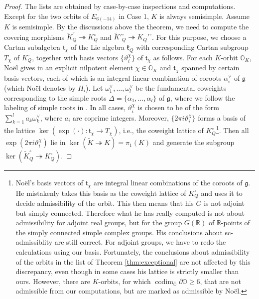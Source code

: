 \documentclass[12pt]{amsart}
\newcommand{\C}{\mathbb{C}}
\newcommand{\g}{\mathfrak{g}}
\newcommand{\Orb}{\mathbb{O}}
\newcommand{\Z}{\mathbb{Z}}
\newcommand{\kf}{\mathfrak{k}}
\newcommand{\tf}{\mathfrak{t}}
\newcommand{\R}{\mathbb{R}}
\theoremstyle{definition}
\numberwithin{equation}{section}
\begin{document}
\begin{proof}
	The lists are obtained by case-by-case inspections and computations. 
	Except for the two orbits of $E_{6(-14)}$ in Case 1, $K$ is always semisimple. Assume $K$ is semisimple. By the discussions above the theorem, we need to compute the covering morphisms $\tilde{K}_Q^\circ \twoheadrightarrow K_Q^\circ$ and $\tilde{K}'^\circ_Q \twoheadrightarrow K_Q'^\circ$. 
	For this purpose, we choose a Cartan subalgebra $\tf_\chi$ of the Lie algebra $\kf_Q$ with corresponding Cartan subgroup $T_\chi$ of $K_Q^\circ$, together with basis vectors $\{\vartheta^{\chi}_i \}$ of $\tf_\chi$ as follows. For each $K$-orbit $\Orb_K$, No{\"e}l gives in \cite{Noel1, Noel2} an explicit nilpotent element $\chi \in \Orb_K$ and $\tf_\chi$ spanned by certain basis vectors, each of which is an integral linear combination of coroots $\alpha^\vee_i$ of $\g$ (which No{\"e}l denotes by $H_i$). Let $\omega^\vee_1, \ldots, \omega^\vee_l$  be the fundamental coweights corresponding to the simple roots $\Delta = \{ \alpha_1, \ldots, \alpha_l \}$ of $\g$, where we follow the labeling of simple roots in \cite{Bourbaki}. In all cases, $\vartheta^{\chi}_i$ is chosen to be of the form $\sum_{k=1}^{l} a_k \omega^\vee_{k}$, where $a_i$ are coprime integers. Moreover, $\{2\pi i \vartheta^{\chi}_i \}$ forms a basis of the lattice $\ker(\exp(\cdot): \tf_\chi \to T_\chi)$, i.e., the coweight lattice of $K_Q^\circ$\footnote{No{\"e}l's basis vectors of $\tf_\chi$ are integral linear combinations of the coroots of $\g$. He mistakenly takes this basis as the coweight lattice of $K_Q^\circ$ and uses it to decide admissibility of the orbit. This then means that his $G$ is not adjoint but simply connected. Therefore what he has really computed is not about admissibility for adjoint real groups, but for the group $G(\R)$ of $\R$-points of the simply connected simple complex groups. His conclusions about sc-admissiblity are still correct. For adjoint groups, we have to redo the calculations using our basis. Fortunately, the conclusions about admissibility of the orbits in the list of Theorem \ref{thm:exceptional} are not affected by this discrepancy, even though in some cases his lattice is strictly smaller than ours. However, there are $K$-orbits, for which $\operatorname{codim}_{\overline{\Orb}}\partial\Orb\geqslant 6$, that are not admissible from our computations, but are marked as admissible by No{\"e}l.}. Then all $\exp(2\pi i \vartheta^{\chi}_i)$ lie in $\ker(\tilde{K} \twoheadrightarrow K) = \pi_1(K)$ and generate the subgroup $\ker(\tilde{K}_Q^\circ \twoheadrightarrow K_Q^\circ)$.

\end{proof}
\end{document}
